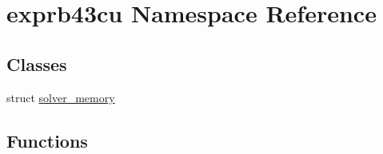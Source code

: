 \hypertarget{namespaceexprb43cu}{}\section{exprb43cu Namespace Reference}
\label{namespaceexprb43cu}
\subsection*{Classes}
\begin{DoxyCompactItemize}
\item 
struct \hyperlink{structexprb43cu_1_1solver__memory}{solver\+\_\+memory}
\end{DoxyCompactItemize}
\subsection*{Functions}
